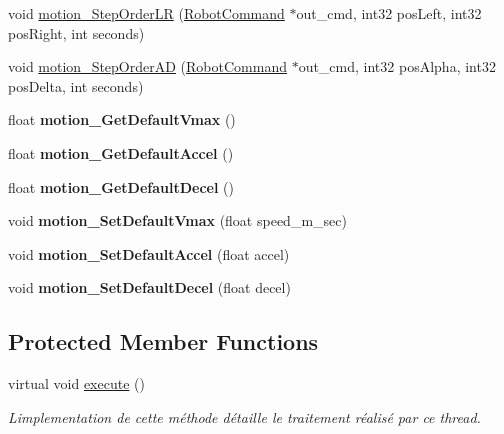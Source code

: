 \begin{DoxyCompactItemize}
\item 
void \hyperlink{classAsservInsa_a8237e3dcb0d9c8852f692c466da10f32}{motion\+\_\+\+Step\+Order\+LR} (\hyperlink{structRobotCommand}{Robot\+Command} $\ast$out\+\_\+cmd, int32 pos\+Left, int32 pos\+Right, int seconds)
\item 
void \hyperlink{classAsservInsa_ab9a32335b1fe9484243f5849680fe510}{motion\+\_\+\+Step\+Order\+AD} (\hyperlink{structRobotCommand}{Robot\+Command} $\ast$out\+\_\+cmd, int32 pos\+Alpha, int32 pos\+Delta, int seconds)
\item 
\mbox{\label{classAsservInsa_a3893eb1ab4224de2931c5aed04461dc7}} 
float {\bfseries motion\+\_\+\+Get\+Default\+Vmax} ()
\item 
\mbox{\label{classAsservInsa_a31dce934fba8861409b304244d6775d8}} 
float {\bfseries motion\+\_\+\+Get\+Default\+Accel} ()
\item 
\mbox{\label{classAsservInsa_a94274dbc29c6d140396c43436d091db6}} 
float {\bfseries motion\+\_\+\+Get\+Default\+Decel} ()
\item 
\mbox{\label{classAsservInsa_a96cf5d8d69183980eedd48d26a2a057d}} 
void {\bfseries motion\+\_\+\+Set\+Default\+Vmax} (float speed\+\_\+m\+\_\+sec)
\item 
\mbox{\label{classAsservInsa_af42a782d8283d3c137108dd511591481}} 
void {\bfseries motion\+\_\+\+Set\+Default\+Accel} (float accel)
\item 
\mbox{\label{classAsservInsa_af61d348814e3696b2463586db43848ea}} 
void {\bfseries motion\+\_\+\+Set\+Default\+Decel} (float decel)
\end{DoxyCompactItemize}
\subsection*{Protected Member Functions}
\begin{DoxyCompactItemize}
\item 
\mbox{\label{classAsservInsa_a67295285fc3a26cb25c99a1f9a88db2c}} 
virtual void \hyperlink{classAsservInsa_a67295285fc3a26cb25c99a1f9a88db2c}{execute} ()
\begin{DoxyCompactList}\small\item\em L\textquotesingle{}implementation de cette méthode détaille le traitement réalisé par ce thread. \end{DoxyCompactList}\end{DoxyCompactItemize}
